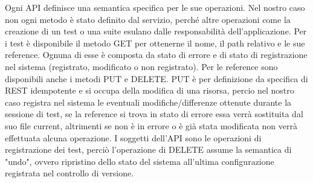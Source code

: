         Ogni API definisce una semantica specifica per le sue operazioni.
        Nel nostro caso non ogni metodo è stato definito dal servizio, perché altre operazioni come la creazione di un test o una suite esulano dalle responsabilità dell'applicazione.
        Per i test è disponibile il metodo GET per  ottenerne il nome, il path relativo e le sue reference.
        Ognuna di esse è composta da stato di errore e di stato di registrazione nel sistema (registrato, modificato o non registrato).
        Per le reference sono disponibili anche i metodi PUT e DELETE. PUT è per definizione da specifica di REST idempotente e si occupa della modifica di una risorsa, percio nel nostro caso registra nel sistema le eventuali modifiche/differenze ottenute durante la sessione di test, se la reference si trova in stato di errore essa verrà sostituita dal suo file current, altrimenti se non è in errore o è già stata modificata non verrà effettuata alcuna operazione.
        I soggetti dell'API sono le operazioni di registrazione dei test, perciò l'operazione di DELETE assume la semantica di "undo", ovvero ripristino dello stato del sistema all'ultima configurazione registrata nel controllo di versione.
        